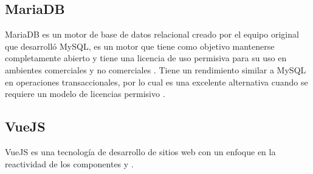 \subsection{MariaDB}


MariaDB es un motor de base de datos relacional creado por el equipo original que desarrolló MySQL, es un motor que tiene como objetivo mantenerse completamente abierto y tiene una licencia de uso permisiva para su uso en ambientes comerciales y no comerciales \cite{mariadb_foundation_2019}. Tiene un rendimiento similar a MySQL en operaciones transaccionales, por lo cual es una excelente alternativa cuando se requiere un modelo de licencias permisivo \cite{mariadb_comparison}.



\subsection{VueJS}

VueJS es una tecnología de desarrollo de sitios web con un enfoque en la reactividad de los componentes y \cite{vuejs_up}.


